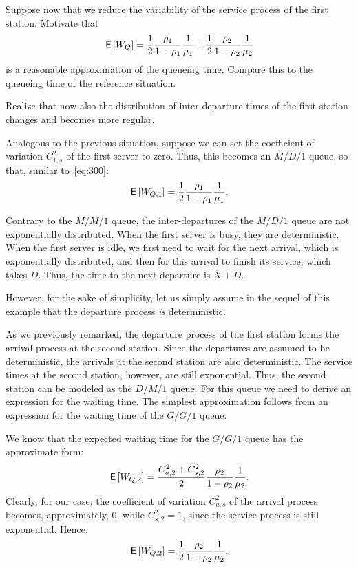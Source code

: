 \begin{exercise}
Suppose now that we reduce the variability of the service process of the first station.
Motivate that 
\begin{equation*}
 \,\mathsf{E}\left[W_Q\right]= \frac12\frac{\rho_1}{1-\rho_1} \frac1{\mu_1} +
 \frac12\frac{\rho_2}{1-\rho_2} \frac1{\mu_2}
\end{equation*}
is a reasonable approximation of the queueing time. Compare this to the queueing time of the reference situation.
\begin{hint}
 Realize that now also the distribution of inter-departure times of the first station changes and becomes more regular.
\end{hint}
\begin{solution}
Analogous to the previous situation, suppose we can set the coefficient of variation
$C_{1,s}^2$ of the first server to zero. Thus, this becomes an $M/D/1$
queue, so that, similar to~\cref{eq:300}:
\begin{equation*}
\,\mathsf{E}\left[W_{Q,1}\right] = \frac{1}2\frac{\rho_1}{1-\rho_1} \frac1{\mu_1}.
\end{equation*}

Contrary to the $M/M/1$ queue, the inter-departures of the $M/D/1$
queue are not exponentially distributed. When the first
server is busy, they are deterministic. When the first server is idle, we first
need to wait for the next arrival, which is exponentially distributed, and then for this arrival to finish its service, which
takes $D$. Thus, the time to the next departure is $X+D$. 

However, for the sake of simplicity, let us simply assume in the sequel of this
example that the departure process \emph{is} deterministic.

As we previously remarked, the departure process of the first station
forms the arrival process at the second station. Since the departures
are assumed to be deterministic, the arrivals at the second station
are also deterministic. The service times at the second station, however, are still
exponential. Thus, the second station can be modeled as
the $D/M/1$ queue. For this queue we need to derive an expression for
the waiting time. The simplest approximation follows from an
expression for the waiting time of the $G/G/1$ queue.

We know that the expected waiting time for the $G/G/1$ queue has
the approximate form:
\begin{equation}\label{eq:500}
\,\mathsf{E}\left[W_{Q,2}\right] = \frac{C_{a,2}^2+C_{s,2}^2}2\frac{\rho_2}{1-\rho_2} \frac1{\mu_2}.
\end{equation}
Clearly, for our case, the coefficient of variation $C_{a,s}^2$ of the
arrival process becomes, approximately, $0$, while $C_{s,2}^2 = 1$,
since the service process is still exponential. Hence,
\begin{equation}\label{eq:400}
\,\mathsf{E}\left[W_{Q,2}\right] = \frac12\frac{\rho_2}{1-\rho_2} \frac1{\mu_2}.
\end{equation}


\end{solution}
\end{exercise}
